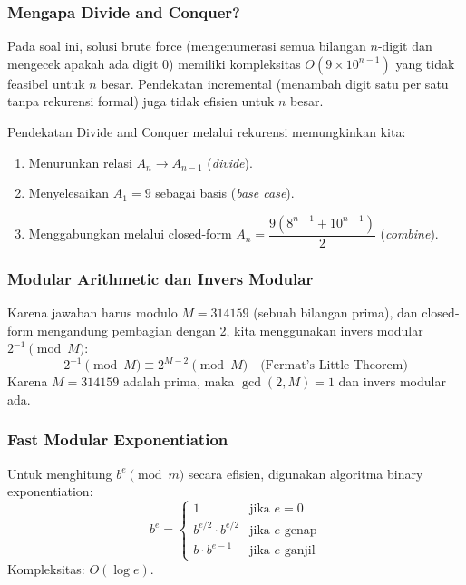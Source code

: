 \documentclass[12pt,a4paper]{article}
\theoremstyle{definition}
\begin{document}
\subsubsection{Mengapa Divide and Conquer?}

Pada soal ini, solusi brute force (mengenumerasi semua bilangan $n$-digit dan
mengecek apakah ada digit 0) memiliki kompleksitas $O(9 \times 10^{n-1})$ yang
tidak feasibel untuk $n$ besar. Pendekatan incremental (menambah digit satu per
satu tanpa rekurensi formal) juga tidak efisien untuk $n$ besar.

Pendekatan Divide and Conquer melalui rekurensi memungkinkan kita:
\begin{enumerate}
  \item Menurunkan relasi $A_n \to A_{n-1}$ (\emph{divide}).
  \item Menyelesaikan $A_1 = 9$ sebagai basis (\emph{base case}).
  \item Menggabungkan melalui closed-form
        $A_n = \dfrac{9(8^{n-1}+10^{n-1})}{2}$ (\emph{combine}).
\end{enumerate}

\subsubsection{Modular Arithmetic dan Invers Modular}

Karena jawaban harus modulo $M = 314159$ (sebuah bilangan prima), dan closed-form
mengandung pembagian dengan 2, kita menggunakan invers modular $2^{-1}\pmod{M}$:
\begin{equation}
  2^{-1}\pmod{M} \equiv 2^{M-2}\pmod{M}
  \quad\text{(Fermat's Little Theorem)}
\end{equation}
Karena $M = 314159$ adalah prima, maka $\gcd(2,M)=1$ dan invers modular ada.

\subsubsection{Fast Modular Exponentiation}

Untuk menghitung $b^e \pmod{m}$ secara efisien, digunakan algoritma binary
exponentiation:
\begin{equation}
  b^e =
  \begin{cases}
    1 & \text{jika } e=0\\
    b^{e/2} \cdot b^{e/2} & \text{jika } e \text{ genap}\\
    b \cdot b^{e-1} & \text{jika } e \text{ ganjil}
  \end{cases}
\end{equation}
Kompleksitas: $O(\log e)$.
\end{document}
